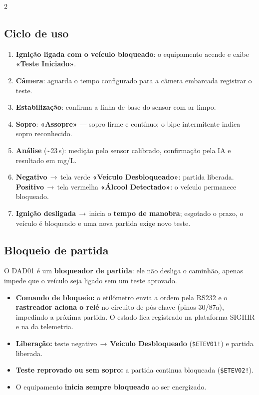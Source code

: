 \documentclass[a4paper,10pt]{article}
\newcommand{\ev}[1]{\texttt{\$ETEV#1!}}
\newcommand{\tela}[1]{\textbf{«#1»}}
\newcommand{\seta}{\,$\rightarrow$\,}
\begin{document}
\begin{multicols}{2}
\subsection{Ciclo de uso}
\begin{enumerate}
  \item \textbf{Ignição ligada com o veículo bloqueado}: o equipamento acende e exibe \tela{Teste Iniciado}.
  \item \textbf{Câmera}: aguarda o tempo configurado para a câmera embarcada registrar o teste.
  \item \textbf{Estabilização}: confirma a linha de base do sensor com ar limpo.
  \item \textbf{Sopro}: \tela{Assopre} — sopro firme e contínuo; o bipe intermitente indica sopro reconhecido.
  \item \textbf{Análise} (\textasciitilde23\,s): medição pelo sensor calibrado, confirmação pela IA e resultado em mg/L.
  \item \textbf{Negativo}\seta tela verde \tela{Veículo Desbloqueado}: partida liberada.
        \textbf{Positivo}\seta tela vermelha \tela{Álcool Detectado}: o veículo permanece bloqueado.
  \item \textbf{Ignição desligada}\seta inicia o \textbf{tempo de manobra}; esgotado o prazo, o veículo é bloqueado e uma nova partida exige novo teste.
\end{enumerate}

\columnbreak
\subsection{Bloqueio de partida}\label{sec:bloqueio}
O DAD01 é um \textbf{bloqueador de partida}: ele não desliga o caminhão, apenas impede que o
veículo seja ligado sem um teste aprovado.
\begin{itemize}
  \item \textbf{Comando de bloqueio:} o etilômetro envia a ordem pela RS232 e o \textbf{rastreador aciona o relé} no circuito de pós-chave (pinos 30/87a), impedindo a próxima partida. O estado fica registrado na plataforma SIGHIR e na da telemetria.
  \item \textbf{Liberação:} teste negativo\seta \textbf{Veículo Desbloqueado} (\ev{01}) e partida liberada.
  \item \textbf{Teste reprovado ou sem sopro:} a partida continua bloqueada (\ev{02}).
  \item O equipamento \textbf{inicia sempre bloqueado} ao ser energizado.
\end{itemize}


\end{multicols}
\end{document}
